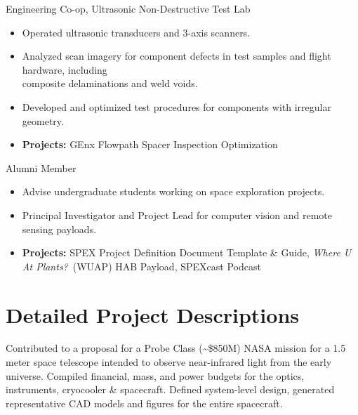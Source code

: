 \documentclass[10pt,final,sans]{resume}
\begin{document}
Engineering Co-op, Ultrasonic Non-Destructive Test Lab
\begin{itemize}
  \item Operated ultrasonic transducers and 3-axis scanners.
  \item Analyzed scan imagery for component defects in test samples and flight hardware, including \\
  composite delaminations and weld voids.
  \item Developed and optimized test procedures for components with irregular geometry.
  \item {\bf Projects:} GEnx Flowpath Spacer Inspection Optimization
\end{itemize}

Alumni Member
\begin{itemize}
  \item Advise undergraduate students working on space exploration projects.
  \item Principal Investigator and Project Lead for computer vision and remote sensing payloads.
  \item {\bf Projects:} SPEX Project Definition Document Template \& Guide, {\it Where U At Plants?}~(WUAP) HAB Payload, SPEXcast Podcast
\end{itemize}


\break
\section{Detailed Project Descriptions}

Contributed to a proposal for a Probe Class (\textasciitilde\$850M) NASA mission for a 1.5 meter space telescope intended to observe near-infrared light from the early universe. Compiled financial, mass, and power budgets for the optics, instruments, cryocooler \& spacecraft. Defined system-level design, generated representative CAD models and figures for the entire spacecraft.
\end{document}
